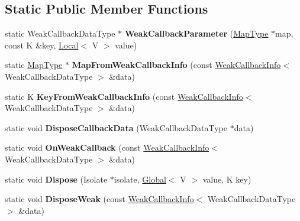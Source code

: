 \subsection*{Static Public Member Functions}
\begin{DoxyCompactItemize}
\item 
\mbox{\label{classv8_1_1DefaultGlobalMapTraits_a3d4b483a077d6e5665cc62a23c719ee8}} 
static Weak\+Callback\+Data\+Type $\ast$ {\bfseries Weak\+Callback\+Parameter} (\mbox{\hyperlink{classv8_1_1GlobalValueMap}{Map\+Type}} $\ast$map, const K \&key, \mbox{\hyperlink{classv8_1_1Local}{Local}}$<$ V $>$ value)
\item 
\mbox{\label{classv8_1_1DefaultGlobalMapTraits_ae65c4d78f93d033712aa328654c00250}} 
static \mbox{\hyperlink{classv8_1_1GlobalValueMap}{Map\+Type}} $\ast$ {\bfseries Map\+From\+Weak\+Callback\+Info} (const \mbox{\hyperlink{classv8_1_1WeakCallbackInfo}{Weak\+Callback\+Info}}$<$ Weak\+Callback\+Data\+Type $>$ \&data)
\item 
\mbox{\label{classv8_1_1DefaultGlobalMapTraits_a2ebc8d3bbfbe32598863ab44caa36207}} 
static K {\bfseries Key\+From\+Weak\+Callback\+Info} (const \mbox{\hyperlink{classv8_1_1WeakCallbackInfo}{Weak\+Callback\+Info}}$<$ Weak\+Callback\+Data\+Type $>$ \&data)
\item 
\mbox{\label{classv8_1_1DefaultGlobalMapTraits_a106883e8168f48826fcfb71aa88e7994}} 
static void {\bfseries Dispose\+Callback\+Data} (Weak\+Callback\+Data\+Type $\ast$data)
\item 
\mbox{\label{classv8_1_1DefaultGlobalMapTraits_a2e50fabc65cf498e981015c1e92ece3e}} 
static void {\bfseries On\+Weak\+Callback} (const \mbox{\hyperlink{classv8_1_1WeakCallbackInfo}{Weak\+Callback\+Info}}$<$ Weak\+Callback\+Data\+Type $>$ \&data)
\item 
\mbox{\label{classv8_1_1DefaultGlobalMapTraits_af2a539ddbe5db2b6e1e944590e1dd7e6}} 
static void {\bfseries Dispose} (Isolate $\ast$isolate, \mbox{\hyperlink{classv8_1_1Global}{Global}}$<$ V $>$ value, K key)
\item 
\mbox{\label{classv8_1_1DefaultGlobalMapTraits_ad3478535925c0f42664c97c4d35d1c91}} 
static void {\bfseries Dispose\+Weak} (const \mbox{\hyperlink{classv8_1_1WeakCallbackInfo}{Weak\+Callback\+Info}}$<$ Weak\+Callback\+Data\+Type $>$ \&data)
\end{DoxyCompactItemize}
